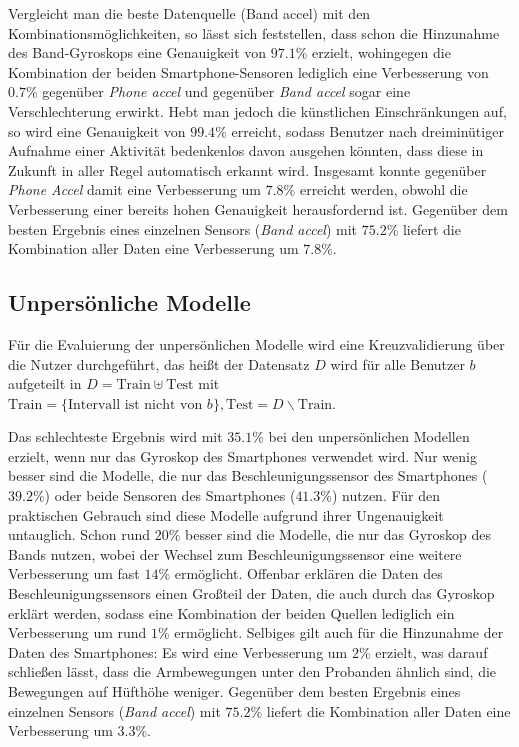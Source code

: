 Vergleicht man die beste Datenquelle (Band accel) mit den Kombinationsmöglichkeiten, so lässt sich feststellen, dass schon die Hinzunahme des Band-Gyroskops eine Genauigkeit von $97.1 \%$ erzielt, wohingegen die Kombination der beiden Smartphone-Sensoren lediglich eine Verbesserung von $0.7 \%$ gegenüber \textit{Phone accel} und gegenüber \textit{Band accel} sogar eine Verschlechterung erwirkt. Hebt man jedoch die künstlichen Einschränkungen auf, so wird eine Genauigkeit von $99.4 \%$ erreicht, sodass Benutzer nach dreiminütiger Aufnahme einer Aktivität bedenkenlos davon ausgehen könnten, dass diese in Zukunft in aller Regel automatisch erkannt wird. Insgesamt konnte gegenüber \textit{Phone Accel} damit eine Verbesserung um $7.8 \%$ erreicht werden, obwohl die Verbesserung einer bereits hohen Genauigkeit herausfordernd ist. Gegenüber dem besten Ergebnis eines einzelnen Sensors (\textit{Band accel}) mit $75.2 \%$ liefert die Kombination aller Daten eine Verbesserung um $7.8 \%$.


\subsection{Unpersönliche Modelle}
Für die Evaluierung der unpersönlichen Modelle wird eine Kreuzvalidierung über die Nutzer durchgeführt, das heißt der Datensatz $D$ wird für alle Benutzer $b$ aufgeteilt in $D = \text{Train} \uplus \text{Test}$ mit $\text{Train} = \{\text{Intervall ist nicht von } b\}, \text{Test} = D \backslash \text{Train}$.

Das schlechteste Ergebnis wird mit $35.1 \%$ bei den unpersönlichen Modellen erzielt, wenn nur das Gyroskop des Smartphones verwendet wird. Nur wenig besser sind die Modelle, die nur das Beschleunigungssensor des Smartphones ($39.2 \%$) oder beide Sensoren des Smartphones ($41.3 \%$) nutzen. Für den praktischen Gebrauch sind diese Modelle aufgrund ihrer Ungenauigkeit untauglich. Schon rund $20 \%$ besser sind die Modelle, die nur das Gyroskop des Bands nutzen, wobei der Wechsel zum Beschleunigungssensor eine weitere Verbesserung um fast $14 \%$ ermöglicht. Offenbar erklären die Daten des Beschleunigungssensors einen Großteil der Daten, die auch durch das Gyroskop erklärt werden, sodass eine Kombination der beiden Quellen lediglich ein Verbesserung um rund $1 \%$ ermöglicht. Selbiges gilt auch für die Hinzunahme der Daten des Smartphones: Es wird eine Verbesserung um $2 \%$ erzielt, was darauf schließen lässt, dass die Armbewegungen unter den Probanden ähnlich sind, die Bewegungen auf Hüfthöhe weniger. Gegenüber dem besten Ergebnis eines einzelnen Sensors (\textit{Band accel}) mit $75.2 \%$ liefert die Kombination aller Daten eine Verbesserung um $3.3 \%$.

